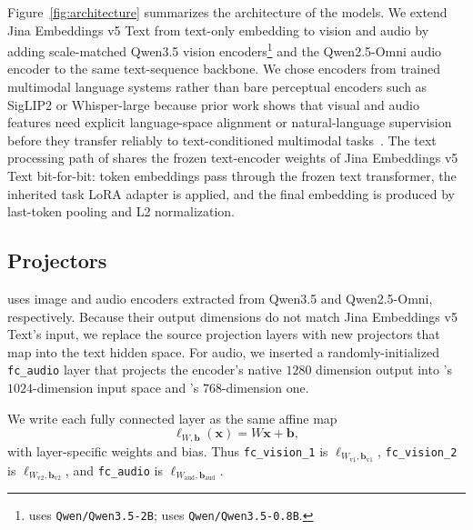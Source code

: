 Figure~\ref{fig:architecture} summarizes the architecture of the \omniBase{} models.
We extend Jina Embeddings v5 Text from text-only embedding to vision and audio by adding scale-matched Qwen3.5 vision encoders\footnote{\omniSmall{} uses \texttt{Qwen/Qwen3.5-2B}; \omniNano{} uses \texttt{Qwen/Qwen3.5-0.8B}.} and the Qwen2.5-Omni audio encoder to the same text-sequence backbone.
We chose encoders from trained multimodal language systems rather than bare perceptual encoders such as SigLIP2 or Whisper-large because prior work shows that visual and audio features need explicit language-space alignment or natural-language supervision before they transfer reliably to text-conditioned multimodal tasks~\cite{comp,clap,qwen3.5,qwen2.5-omni}.
The text processing path of \omniBase{} shares the frozen text-encoder weights of Jina Embeddings v5 Text bit-for-bit: token embeddings pass through the frozen text transformer, the inherited task LoRA adapter is applied, and the final embedding is produced by last-token pooling and L2 normalization.

\subsection{Projectors}
\label{sec:method:projectors}

\omniBase{} uses image and audio encoders extracted from Qwen3.5 and Qwen2.5-Omni, respectively. Because their output dimensions do not match Jina Embeddings v5 Text's input, we replace the source projection layers with new projectors that map into the text hidden space.
For audio, we inserted a randomly-initialized \texttt{fc\_audio} layer that projects the encoder's native $1280$ dimension output into \omniSmall{}'s $1024$-dimension input space and \omniNano{}'s $768$-dimension one.

We write each fully connected layer as the same affine map
\begin{equation*}
\ell_{W,\mathbf{b}}(\mathbf{x}) = W\mathbf{x} + \mathbf{b},
\label{eq:linear_layer}
\end{equation*}
with layer-specific weights and bias.
Thus \texttt{fc\_vision\_1} is $\ell_{W_{\text{v1}},\mathbf{b}_{\text{v1}}}$, \texttt{fc\_vision\_2} is $\ell_{W_{\text{v2}},\mathbf{b}_{\text{v2}}}$, and \texttt{fc\_audio} is $\ell_{W_{\text{aud}},\mathbf{b}_{\text{aud}}}$.

